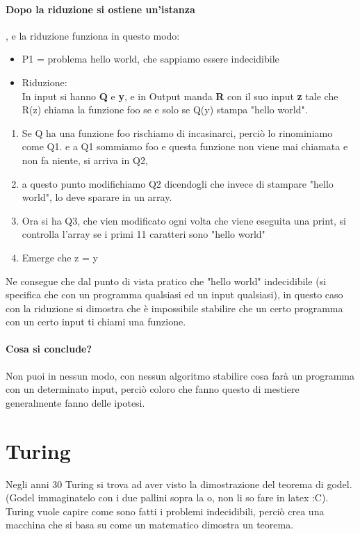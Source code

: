 \documentclass[12pt, a4paper, openany, oneside]{book}
\begin{document}
	\paragraph{Dopo la riduzione si ostiene un'istanza}, e la riduzione funziona 
	in questo modo:
	\begin{itemize}
		\item P1 = problema hello world, che sappiamo essere indecidibile
		\item Riduzione:\\
		In input si hanno \textbf{Q} e \textbf{y}, e in Output manda \textbf{R} 
		con il suo input \textbf{z} tale che 
		R(z) chiama la funzione foo se e solo se Q(y) stampa "hello world". 
	\end{itemize}
	\begin{enumerate}
		\item Se Q ha una funzione foo rischiamo di incasinarci, perciò lo rinominiamo come Q1.
		e a Q1 sommiamo foo e questa funzione non viene mai chiamata e non fa niente, 
		si arriva in Q2,
		\item a questo punto modifichiamo Q2 dicendogli che invece di stampare
		"hello world", lo deve sparare in un array. 
		\item Ora si ha Q3, che vien modificato 
		ogni volta che viene eseguita una print, si controlla l'array se i primi 11 
		caratteri sono "hello world"
		\item Emerge che z = y
	\end{enumerate}
	Ne consegue che dal punto di vista pratico che "hello world" indecidibile (si 
	specifica che con un programma qualsiasi ed un input qualsiasi), in questo caso
	con la riduzione si dimostra che è impossibile stabilire che un certo programma
	con un certo input ti chiami una funzione.
	\paragraph{Cosa si conclude? }Non puoi in nessun modo, con nessun algoritmo 
	stabilire cosa farà un programma con un determinato input, perciò coloro che
	fanno questo di mestiere generalmente fanno delle ipotesi. 
	\section{Turing}
	Negli anni 30 Turing si trova ad aver visto la dimostrazione del teorema di godel.
	(Godel immaginatelo con i due pallini sopra la o, non li so fare in latex :C).
	Turing vuole capire come sono fatti i problemi indecidibili, perciò crea una 
	macchina che si basa su come un matematico dimostra un teorema.
\end{document}
